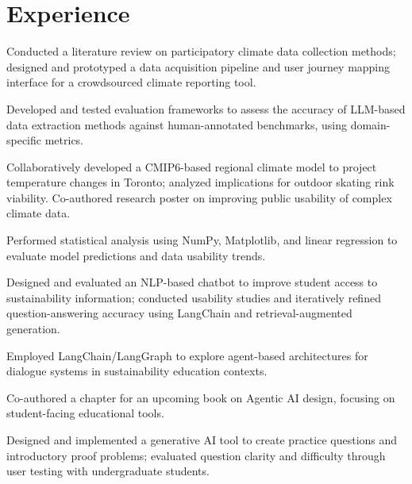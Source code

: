 \documentclass[letterpaper,10pt]{article}
\begin{document}
    \section{Experience}
    \begin{resume_list}
        \item Conducted a literature review on participatory climate data collection methods; designed and prototyped a data acquisition pipeline and user journey mapping interface for a crowdsourced climate reporting tool.
        \item Developed and tested evaluation frameworks to assess the accuracy of LLM-based data extraction methods against human-annotated benchmarks, using domain-specific metrics.
        \item Collaboratively developed a CMIP6-based regional climate model to project temperature changes in Toronto; analyzed implications for outdoor skating rink viability. Co-authored research poster on improving public usability of complex climate data.
        \item Performed statistical analysis using NumPy, Matplotlib, and linear regression to evaluate model predictions and data usability trends.
    \end{resume_list}
    \begin{resume_list}
        \item Designed and evaluated an NLP-based chatbot to improve student access to sustainability information; conducted usability studies and iteratively refined question-answering accuracy using LangChain and retrieval-augmented generation.
        \item Employed LangChain/LangGraph to explore agent-based architectures for dialogue systems in sustainability education contexts.
    \end{resume_list}
    \begin{resume_list}
        \item Co-authored a chapter for an upcoming book on Agentic AI design, focusing on student-facing educational tools.
        \item Designed and implemented a generative AI tool to create practice questions and introductory proof problems; evaluated question clarity and difficulty through user testing with undergraduate students.
    \end{resume_list}
    
\end{document}
